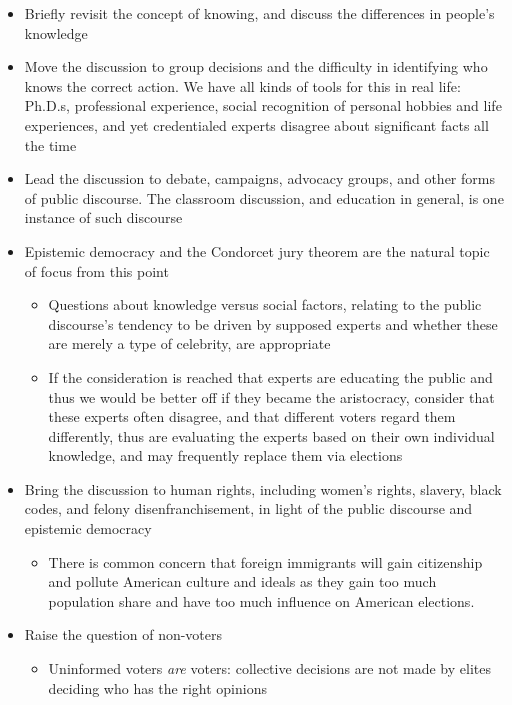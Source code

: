 \begin{itemize}
    \item Briefly revisit the concept of knowing, and discuss the differences in people's knowledge

    \item Move the discussion to group decisions and the difficulty in identifying who knows the correct action.  We have all kinds of tools for this in real life:  Ph.D.s, professional experience, social recognition of personal hobbies and life experiences, and yet credentialed experts disagree about significant facts all the time

    \item Lead the discussion to debate, campaigns, advocacy groups, and other forms of public discourse.  The classroom discussion, and education in general, is one instance of such discourse

    \item Epistemic democracy and the Condorcet jury theorem are the natural topic of focus from this point
    \begin{itemize}
        \item Questions about knowledge versus social factors, relating to the public discourse's tendency to be driven by supposed experts and whether these are merely a type of celebrity, are appropriate

        \item If the consideration is reached that experts are educating the public and thus we would be better off if they became the aristocracy, consider that these experts often disagree, and that different voters regard them differently, thus are evaluating the experts based on their own individual knowledge, and may frequently replace them via elections
    \end{itemize}

    \item Bring the discussion to human rights, including women's rights, slavery, black codes, and felony disenfranchisement, in light of the public discourse and epistemic democracy
    \begin{itemize}
        \item There is common concern that foreign immigrants will gain citizenship and pollute American culture and ideals as they gain too much population share and have too much influence on American elections.
    \end{itemize}

    \item Raise the question of non-voters
    \begin{itemize}
        \item Uninformed voters \textit{are} voters:  collective decisions are not made by elites deciding who has the right opinions


\end{itemize}
\end{itemize}
